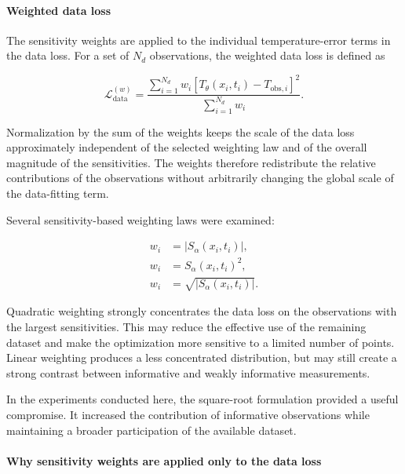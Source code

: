 \paragraph{Weighted data loss}

The sensitivity weights are applied to the individual temperature-error terms in
the data loss. For a set of $N_d$ observations, the weighted data loss is defined
as

\begin{equation}
\mathcal{L}_{\mathrm{data}}^{(w)}
=
\frac{
\displaystyle
\sum_{i=1}^{N_d}
w_i
\left[
T_{\theta}(x_i,t_i)-T_{\mathrm{obs},i}
\right]^2
}{
\displaystyle
\sum_{i=1}^{N_d} w_i
}.
\end{equation}

Normalization by the sum of the weights keeps the scale of the data loss
approximately independent of the selected weighting law and of the overall
magnitude of the sensitivities. The weights therefore redistribute the relative
contributions of the observations without arbitrarily changing the global scale
of the data-fitting term.

Several sensitivity-based weighting laws were examined:

\begin{align}
w_i
&=
\left|S_{\alpha}(x_i,t_i)\right|,
\\
w_i
&=
S_{\alpha}(x_i,t_i)^2,
\\
w_i
&=
\sqrt{
\left|S_{\alpha}(x_i,t_i)\right|
}.
\end{align}

Quadratic weighting strongly concentrates the data loss on the observations with
the largest sensitivities. This may reduce the effective use of the remaining
dataset and make the optimization more sensitive to a limited number of points.
Linear weighting produces a less concentrated distribution, but may still create
a strong contrast between informative and weakly informative measurements.

In the experiments conducted here, the square-root formulation provided a useful
compromise. It increased the contribution of informative observations while
maintaining a broader participation of the available dataset.

\paragraph{Why sensitivity weights are applied only to the data loss}

